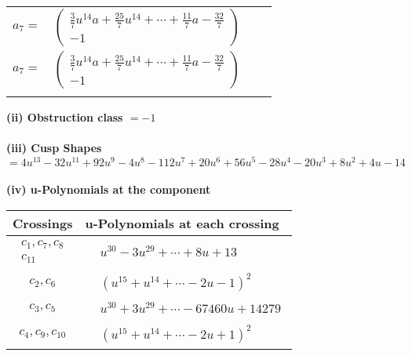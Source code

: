 \documentclass[1p]{elsarticle_modified}
\theoremstyle{definition}
\begin{document}
\begin{tabular}{m{7pt} m{180pt} m{7pt} m{180pt} }
\flushright $a_{7}=$&$\begin{pmatrix}\frac{3}{7} u^{14} a+\frac{25}{7} u^{14}+\cdots+\frac{11}{7} a-\frac{32}{7}\\-1\end{pmatrix}$\\ \flushright $a_{7}=$&$\begin{pmatrix}\frac{3}{7} u^{14} a+\frac{25}{7} u^{14}+\cdots+\frac{11}{7} a-\frac{32}{7}\\-1\end{pmatrix}$\\&\end{tabular}
\flushleft \textbf{(ii) Obstruction class $= -1$}\\~\\
\flushleft \textbf{(iii) Cusp Shapes $= 4 u^{13}-32 u^{11}+92 u^9-4 u^8-112 u^7+20 u^6+56 u^5-28 u^4-20 u^3+8 u^2+4 u-14$}\\~\\
\newpage\renewcommand{\arraystretch}{1}
\flushleft \textbf{(iv) u-Polynomials at the component}\newline \\
\begin{tabular}{m{50pt}|m{274pt}}
Crossings & \hspace{64pt}u-Polynomials at each crossing \\
\hline $$\begin{aligned}c_{1},c_{7},c_{8}\\c_{11}\end{aligned}$$&$\begin{aligned}
&u^{30}-3 u^{29}+\cdots+8 u+13
\end{aligned}$\\
\hline $$\begin{aligned}c_{2},c_{6}\end{aligned}$$&$\begin{aligned}
&(u^{15}+u^{14}+\cdots-2 u-1)^{2}
\end{aligned}$\\
\hline $$\begin{aligned}c_{3},c_{5}\end{aligned}$$&$\begin{aligned}
&u^{30}+3 u^{29}+\cdots-67460 u+14279
\end{aligned}$\\
\hline $$\begin{aligned}c_{4},c_{9},c_{10}\end{aligned}$$&$\begin{aligned}
&(u^{15}+u^{14}+\cdots-2 u+1)^{2}
\end{aligned}$\\
\hline
\end{tabular}\\~\\
\end{document}
